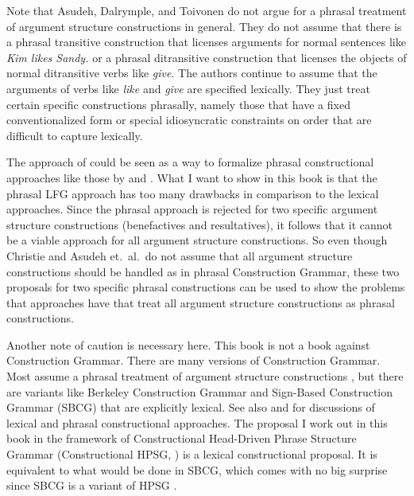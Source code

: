   Note that Asudeh, Dalrymple, and Toivonen do not argue for a phrasal treatment of argument
  structure constructions in general. They do not assume that there is a phrasal transitive
  construction that licenses arguments for normal sentences like \emph{Kim likes Sandy.} or a
  phrasal ditransitive construction that licenses the objects of normal ditransitive verbs like
  \emph{give}. The authors continue to assume that the arguments of verbs like \emph{like} and
  \emph{give} are specified lexically. They
  just treat certain specific constructions phrasally, namely those that have a fixed
  conventionalized form or special idiosyncratic constraints on order that are difficult to capture lexically.


  The approach of  could be seen as a way to formalize phrasal constructional
  approaches like those by \citet{Goldberg95a,Goldberg2004a} and \citet{CJ2005a}. What I want to
  show in this book is that the phrasal LFG approach has
  too many drawbacks in comparison to the lexical approaches. Since the phrasal approach is rejected
  for two specific argument structure constructions (benefactives and resultatives), it follows that it cannot be a viable approach
  for all argument structure constructions. So even though Christie and Asudeh et.\ al.\ do not
  assume that all argument structure constructions should be handled as in phrasal Construction
  Grammar, these two proposals for two specific phrasal constructions can be used to show the problems that approaches have that
  treat all argument structure constructions as phrasal constructions.

Another note of caution is necessary here. This book is not a book against Construction
Grammar. There are many versions of Construction Grammar. Most assume a phrasal treatment of
argument structure constructions
\citep{Tomasello2003a,Goldberg95a,Goldberg2006a,GJ2004a,BC2005a,vanTrijp2011a}, but there are variants
like Berkeley Construction Grammar \citep{Kay2005a} and Sign-Based Construction Grammar (SBCG)
\citep{SBK2012a} that are explicitly lexical. See also  and 
for discussions of lexical and phrasal constructional approaches. The proposal I work out in this
book in the framework of Constructional Head-Driven Phrase Structure Grammar (Constructional HPSG,
\citealp{Sag97a}) is a lexical constructional proposal. It is equivalent to what would be done in
SBCG, which comes with no big surprise since SBCG is a variant of HPSG \citep[486]{Sag2010b}.

